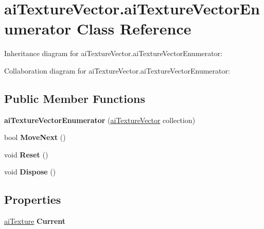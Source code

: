 \hypertarget{classai_texture_vector_1_1ai_texture_vector_enumerator}{\section{ai\+Texture\+Vector.\+ai\+Texture\+Vector\+Enumerator Class Reference}
\label{classai_texture_vector_1_1ai_texture_vector_enumerator}
}


Inheritance diagram for ai\+Texture\+Vector.\+ai\+Texture\+Vector\+Enumerator\+:


Collaboration diagram for ai\+Texture\+Vector.\+ai\+Texture\+Vector\+Enumerator\+:
\subsection*{Public Member Functions}
\begin{DoxyCompactItemize}
\item 
\hypertarget{classai_texture_vector_1_1ai_texture_vector_enumerator_a04893232726b21f236d48b2756382d07}{{\bfseries ai\+Texture\+Vector\+Enumerator} (\hyperlink{classai_texture_vector}{ai\+Texture\+Vector} collection)}\label{classai_texture_vector_1_1ai_texture_vector_enumerator_a04893232726b21f236d48b2756382d07}

\item 
\hypertarget{classai_texture_vector_1_1ai_texture_vector_enumerator_abea39c79f4fde226d6454d3c287a509b}{bool {\bfseries Move\+Next} ()}\label{classai_texture_vector_1_1ai_texture_vector_enumerator_abea39c79f4fde226d6454d3c287a509b}

\item 
\hypertarget{classai_texture_vector_1_1ai_texture_vector_enumerator_a54ca72e8a4b4d0029db5d914e5dbe3b0}{void {\bfseries Reset} ()}\label{classai_texture_vector_1_1ai_texture_vector_enumerator_a54ca72e8a4b4d0029db5d914e5dbe3b0}

\item 
\hypertarget{classai_texture_vector_1_1ai_texture_vector_enumerator_a6bd1ad26edeebb15559492aae02f50d4}{void {\bfseries Dispose} ()}\label{classai_texture_vector_1_1ai_texture_vector_enumerator_a6bd1ad26edeebb15559492aae02f50d4}

\end{DoxyCompactItemize}
\subsection*{Properties}
\begin{DoxyCompactItemize}
\item 
\hypertarget{classai_texture_vector_1_1ai_texture_vector_enumerator_ad58ebb81ba729d21d1429b5f389d66d7}{\hyperlink{structai_texture}{ai\+Texture} {\bfseries Current}}\label{classai_texture_vector_1_1ai_texture_vector_enumerator_ad58ebb81ba729d21d1429b5f389d66d7}

\end{DoxyCompactItemize}


